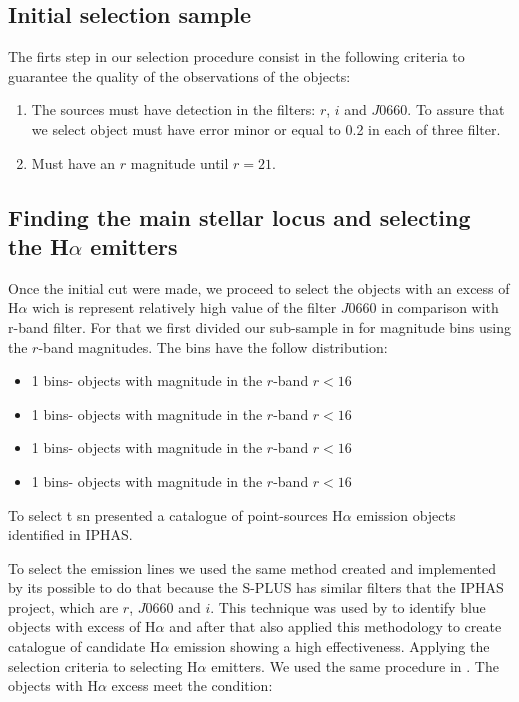 \documentclass[fleqn,usenatbib]{mnras}
\begin{document}
\subsection{Initial selection sample}
\label{sec:}

The firts step in our selection procedure consist in the following criteria to guarantee the quality of the observations of the objects:

\begin{enumerate}
\item The sources must have detection in the filters: $r$, $i$ and $J$0660. To assure that we select object must have error minor or equal to 0.2 in each of three filter.

\item Must have an $r$ magnitude until $r = 21$.
  
\end{enumerate}

\subsection{Finding the main stellar locus and selecting the H{$\alpha$ emitters} }
\label{sec:}

Once the initial cut were made, we proceed to select the objects with an excess of H{$\alpha$} wich is represent relatively high value of the filter $J$0660 in comparison with r-band filter. For that we first divided our sub-sample in for magnitude bins using the $r$-band magnitudes. The bins have the follow distribution:

\begin{itemize}
\item 1 bins- objects with magnitude in the $r$-band $r<16$
\item 1 bins- objects with magnitude in the $r$-band $r<16$
\item 1 bins- objects with magnitude in the $r$-band $r<16$
\item 1 bins- objects with magnitude in the $r$-band $r<16$
  
\end{itemize}

To select t sn
\citet{Witham:2008} presented a catalogue of point-sources H{$\alpha$} emission objects identified in IPHAS. 

To select the emission lines we used the same method created and implemented by \citet{Witham:2008} its possible to do that because the S-PLUS has similar filters that the IPHAS project, which are $r$, $J$0660 and $i$. This technique was used by \citet{Scaringi:2013} to identify blue objects with excess of H{$\alpha$} and after that \citet{Wevers:2017} also applied this methodology to create catalogue of candidate H{$\alpha$} emission showing a high effectiveness.    
Applying the selection criteria to selecting H$\alpha$ emitters. We used the same procedure in  \citet{Wevers:2017}. The objects with H$\alpha$ excess meet the condition:
\end{document}
